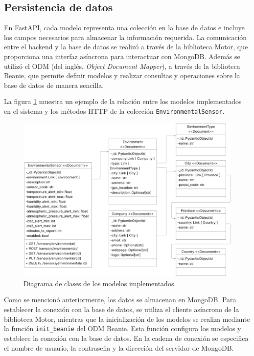 \subsection{Persistencia de datos}

En FastAPI, cada modelo representa una colección en la base de datos e incluye
los campos necesarios para almacenar la información requerida. La comunicación
entre el backend y la base de datos se realizó a través de la biblioteca Motor,
que proporciona una interfaz asíncrona para interactuar con MongoDB. Además se
utilizó el ODM (del inglés, \textit{Object Document Mapper}), a través de la
biblioteca Beanie, que permite definir modelos y realizar consultas y
operaciones sobre la base de datos de manera sencilla.

La figura \ref{fig:diagrama de clases} muestra un ejemplo de la relación entre
los modelos implementados en el sistema y los métodos HTTP de la colección
\texttt{EnvironmentalSensor}.

\begin{figure}[H]
    \centering
    \includegraphics[width=.88\textwidth]{./Images/18.png}
    \caption{Diagrama de clases de los modelos implementados.}
    \label{fig:diagrama de clases}
\end{figure}

Como se mencionó anteriormente, los datos se almacenan en MongoDB. Para
establecer la conexión con la base de datos, se utiliza el cliente asíncrono de
la biblioteca Motor, mientras que la inicialización de los modelos se realiza
mediante la función \texttt{init\_beanie} del ODM Beanie. Esta función
configura los modelos y establece la conexión con la base de datos. En la
cadena de conexión se especifica el nombre de usuario, la contraseña y la
dirección del servidor de MongoDB.

